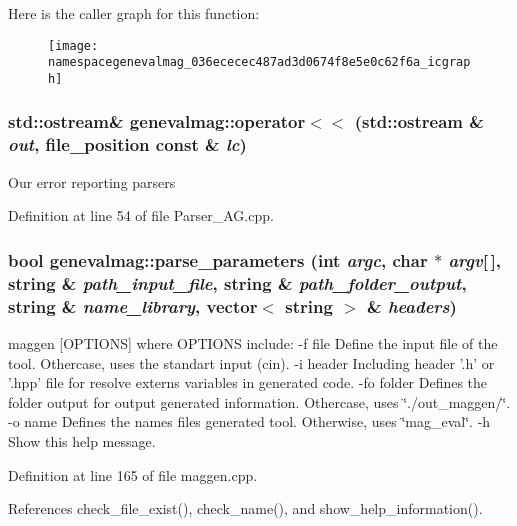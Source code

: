 Here is the caller graph for this function:\nopagebreak
\begin{figure}[H]
\begin{center}
\leavevmode
\texttt{[image: namespacegenevalmag\_036ececec487ad3d0674f8e5e0c62f6a\_icgraph]}
\end{center}
\end{figure}
\hypertarget{namespacegenevalmag_4093becff20c4564db790c08c1189aaf}{
\subsubsection[{operator$<$$<$}]{\setlength{\rightskip}{0pt plus 5cm}std::ostream\& genevalmag::operator$<$$<$ (std::ostream \& {\em out}, \/  file\_\-position const \& {\em lc})}}
\label{namespacegenevalmag_4093becff20c4564db790c08c1189aaf}


Our error reporting parsers 

Definition at line 54 of file Parser\_\-AG.cpp.\hypertarget{namespacegenevalmag_d3dcc8f1c112c2fee686c837e5250124}{
\subsubsection[{parse\_\-parameters}]{\setlength{\rightskip}{0pt plus 5cm}bool genevalmag::parse\_\-parameters (int {\em argc}, \/  char $\ast$ {\em argv}\mbox{[}$\,$\mbox{]}, \/  string \& {\em path\_\-input\_\-file}, \/  string \& {\em path\_\-folder\_\-output}, \/  string \& {\em name\_\-library}, \/  vector$<$ string $>$ \& {\em headers})}}
\label{namespacegenevalmag_d3dcc8f1c112c2fee686c837e5250124}


maggen \mbox{[}OPTIONS\mbox{]} where OPTIONS include: -f file Define the input file of the tool. Othercase, uses the standart input (cin). -i header Including header '.h' or '.hpp' file for resolve externs variables in generated code. -fo folder Defines the folder output for output generated information. Othercase, uses \char`\"{}./out\_\-maggen/\char`\"{}. -o name Defines the names files generated tool. Otherwise, uses \char`\"{}mag\_\-eval\char`\"{}. -h Show this help message. 

Definition at line 165 of file maggen.cpp.

References check\_\-file\_\-exist(), check\_\-name(), and show\_\-help\_\-information().

